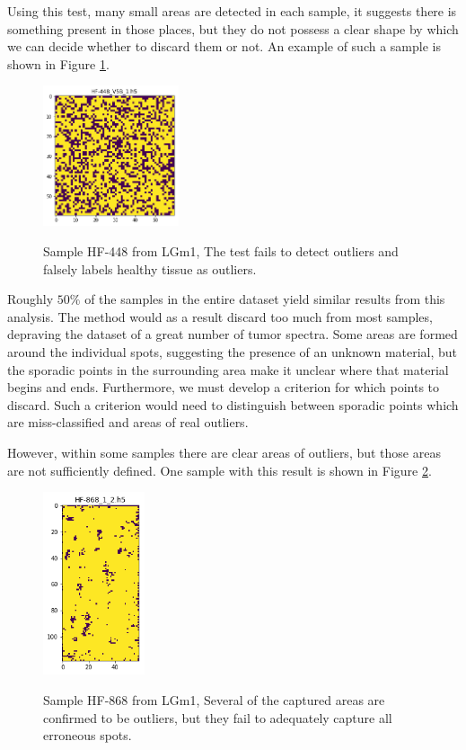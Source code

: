 Using this test, many small areas are detected in each sample, it suggests there is something present in those places, but they do not possess a clear shape by which we can decide whether to discard them or not. An example of such a sample is shown in Figure \ref{fig:stdHF448}.

\begin{figure}[H]

    \centering
{\includegraphics[width=4cm]{images/STDtest/LGm-1/HF-448_V5B_1.h5_3.png} }
\caption{Sample HF-448 from LGm1, The test fails to detect outliers and falsely labels healthy tissue as outliers.\label{fig:stdHF448}}%

\end{figure}

Roughly $50\%$ of the samples in the entire dataset yield similar results from this analysis. The method would as a result discard too much from most samples, depraving the dataset of a great number of tumor spectra. Some areas are formed around the individual spots, suggesting the presence of an unknown material, but the sporadic points in the surrounding area make it unclear where that material begins and ends. Furthermore, we must develop a criterion for which points to discard. Such a criterion would need to distinguish between sporadic points which are miss-classified and areas of real outliers.

However, within some samples there are clear areas of outliers, but those areas are not sufficiently defined. One sample with this result is shown in Figure \ref{fig:stdHF868}.

\begin{figure}[H]
	\centering
{\includegraphics[width=3cm]{images/STDtest/LGm-1/HF-868_1_2.h5_0.png} }
\caption{Sample HF-868 from LGm1, Several of the captured areas are confirmed to be outliers, but they fail to adequately capture all erroneous spots.
\label{fig:stdHF868}}

\end{figure}


